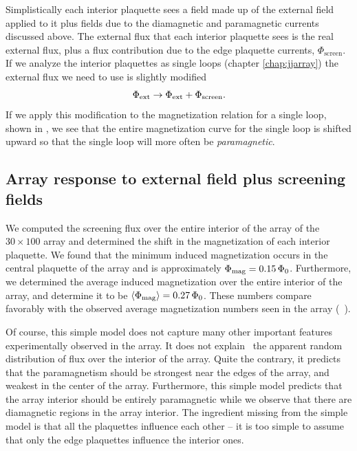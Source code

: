 Simplistically 
each interior plaquette sees a field made up of the external field
applied to it plus fields due to the diamagnetic and paramagnetic currents
discussed above. 
The external flux
that each interior plaquette sees is the real external flux, 
plus a flux contribution due to the edge plaquette currents,
$\Phi_{\mathrm{screen}}$.
If we analyze the interior plaquettes as single loops 
(chapter \ref{chap:jjarray}) the external flux we need to use
is slightly modified
%
\begin{equation}
\Phi_{\mathrm{ext}} \rightarrow \Phi_{\mathrm{ext}} + \Phi_{\mathrm{screen}}.
\label{eqn:ext_flux_redef}
\end{equation}
%
If we apply this modification to the magnetization relation for a 
single loop, shown in , we see that the
entire magnetization curve for the single loop is shifted upward
so that the single loop will more often be 
\emph{paramagnetic}. 

\subsection{Array response to external field plus screening fields}

We computed the screening flux
over the entire interior of the array
of the $30 \times 100$ array and
determined the shift in the magnetization of each interior
plaquette. We found that the 
minimum induced magnetization occurs in the central plaquette of
the array and is approximately $\Phi_{\mathrm{mag}}=0.15\,\Phi_0$. Furthermore,
we determined the average induced magnetization over the 
entire interior of the array, and determine it to be 
$\langle\Phi_{\mathrm{mag}}\rangle=0.27\,\Phi_0$. 
These numbers compare favorably with the observed
average
magnetization numbers seen in the array (\cf\ ).

Of course, this simple model does not capture many other important
features experimentally observed in the array. It does not explain
\eg\ the apparent random distribution of flux over the interior of the
array. Quite the contrary, it predicts that the paramagnetism should
be strongest near the edges of the array, and weakest in the center
of the array. Furthermore, this simple model predicts that the array
interior
should be entirely paramagnetic while we observe that there
are diamagnetic regions in the array interior. 
The ingredient missing from the simple model is that all
the plaquettes influence each other -- it is too simple to assume
that only the edge plaquettes influence the interior ones. 


